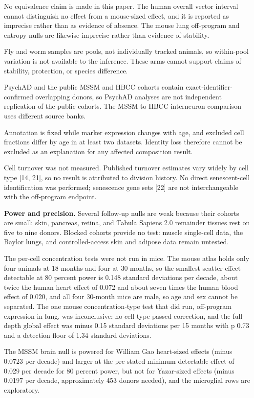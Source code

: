 \documentclass[11pt]{article}
\begin{document}
No equivalence claim is made in this paper. The human overall vector interval cannot distinguish no effect from a mouse-sized effect, and it is reported as imprecise rather than as evidence of absence. The mouse lung off-program and entropy nulls are likewise imprecise rather than evidence of stability.

Fly and worm samples are pools, not individually tracked animals, so within-pool variation is not available to the inference. These arms cannot support claims of stability, protection, or species difference.

PsychAD and the public MSSM and HBCC cohorts contain exact-identifier-confirmed overlapping donors, so PsychAD analyses are not independent replication of the public cohorts. The MSSM to HBCC interneuron comparison uses different source banks.

Annotation is fixed while marker expression changes with age, and excluded cell fractions differ by age in at least two datasets. Identity loss therefore cannot be excluded as an explanation for any affected composition result.

Cell turnover was not measured. Published turnover estimates vary widely by cell type [14, 21], so no result is attributed to division history. No direct senescent-cell identification was performed; senescence gene sets [22] are not interchangeable with the off-program endpoint.

\textbf{Power and precision.} Several follow-up nulls are weak because their cohorts are small: skin, pancreas, retina, and Tabula Sapiens 2.0 remainder tissues rest on five to nine donors. Blocked cohorts provide no test: muscle single-cell data, the Baylor lungs, and controlled-access skin and adipose data remain untested.

The per-cell concentration tests were not run in mice. The mouse atlas holds only four animals at 18 months and four at 30 months, so the smallest scatter effect detectable at 80 percent power is 0.148 standard deviations per decade, about twice the human heart effect of 0.072 and about seven times the human blood effect of 0.020, and all four 30-month mice are male, so age and sex cannot be separated. The one mouse concentration-type test that did run, off-program expression in lung, was inconclusive: no cell type passed correction, and the full-depth global effect was minus 0.15 standard deviations per 15 months with p 0.73 and a detection floor of 1.34 standard deviations.

The MSSM brain null is powered for William Gao heart-sized effects (minus 0.0723 per decade) and larger at the pre-stated minimum detectable effect of 0.029 per decade for 80 percent power, but not for Yazar-sized effects (minus 0.0197 per decade, approximately 453 donors needed), and the microglial rows are exploratory.
\end{document}
